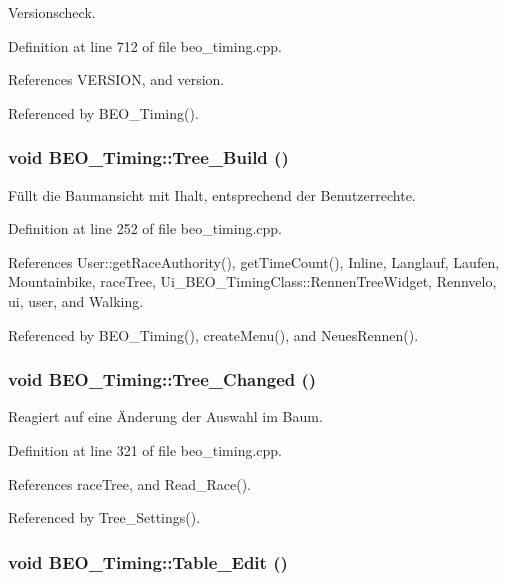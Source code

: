 Versionscheck. 



Definition at line 712 of file beo\_\-timing.cpp.

References VERSION, and version.

Referenced by BEO\_\-Timing().\hypertarget{class_b_e_o___timing_454b16d1cfe5763b0812114e82108e55}{
\subsubsection[Tree\_\-Build]{\setlength{\rightskip}{0pt plus 5cm}void BEO\_\-Timing::Tree\_\-Build ()}}
\label{class_b_e_o___timing_454b16d1cfe5763b0812114e82108e55}


Füllt die Baumansicht mit Ihalt, entsprechend der Benutzerrechte. 



Definition at line 252 of file beo\_\-timing.cpp.

References User::getRaceAuthority(), getTimeCount(), Inline, Langlauf, Laufen, Mountainbike, raceTree, Ui\_\-BEO\_\-TimingClass::RennenTreeWidget, Rennvelo, ui, user, and Walking.

Referenced by BEO\_\-Timing(), createMenu(), and NeuesRennen().\hypertarget{class_b_e_o___timing_e6ea4891e62ef27156bba2ddec60683a}{
\subsubsection[Tree\_\-Changed]{\setlength{\rightskip}{0pt plus 5cm}void BEO\_\-Timing::Tree\_\-Changed ()}}
\label{class_b_e_o___timing_e6ea4891e62ef27156bba2ddec60683a}


Reagiert auf eine Änderung der Auswahl im Baum. 



Definition at line 321 of file beo\_\-timing.cpp.

References raceTree, and Read\_\-Race().

Referenced by Tree\_\-Settings().\hypertarget{class_b_e_o___timing_c854db88175caa8572dd15831b4bfb18}{
\subsubsection[Table\_\-Edit]{\setlength{\rightskip}{0pt plus 5cm}void BEO\_\-Timing::Table\_\-Edit ()}}
\label{class_b_e_o___timing_c854db88175caa8572dd15831b4bfb18}


